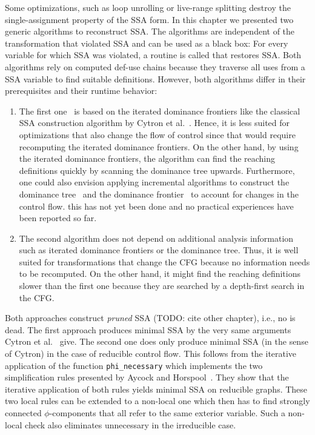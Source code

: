 Some optimizations, such as loop unrolling or live-range splitting destroy the single-assignment property of the SSA form.
In this chapter we presented two generic algorithms to reconstruct SSA.
The algorithms are independent of the transformation that violated SSA and can be used as a black box:
For every variable for which SSA was violated, a routine is called that restores SSA.
Both algorithms rely on computed def-use chains because they traverse all uses from a SSA variable to find suitable definitions.
However, both algorithms differ in their prerequisites and their runtime behavior:
\begin{enumerate}
	\item 
		The first one~\cite{Choi:1996ji} is based on the iterated dominance frontiers like the classical SSA construction algorithm by Cytron et al.~\cite{cytron:1991:ssa}.
		Hence, it is less suited for optimizations that also change the flow of control since that would require recomputing the iterated dominance frontiers.
		On the other hand, by using the iterated dominance frontiers, the algorithm can find the reaching definitions quickly by scanning the dominance tree upwards.
		Furthermore, one could also envision applying incremental algorithms to construct the dominance tree~\cite{Ramalingam:1994iq,Sreedhar:1995:ICD:202529.202531} and the dominance frontier~\cite{Sreedhar:1996:NFE:231379.231434} to account for changes in the control flow. 
		this has not yet been done and no practical experiences have been reported so far.
	\item 
		The second algorithm does not depend on additional analysis information such as iterated dominance frontiers or the dominance tree.
		Thus, it is well suited for transformations that change the CFG because no information needs to be recomputed.
		On the other hand, it might find the reaching definitions slower than the first one because they are searched by a depth-first search in the CFG.
\end{enumerate}
Both approaches construct \emph{pruned} SSA (TODO: cite other chapter), i.e., no \phifun is dead. 
The first approach produces minimal SSA by the very same arguments Cytron et al.~\cite{cytron:1991:ssa} give.
The second one does only produce minimal SSA (in the sense of Cytron) in the case of reducible control flow. 
This follows from the iterative application of the function \verb|phi_necessary| which implements the two simplification rules presented by Aycock and Horspool~\cite{Aycock_Horspool_2000}.
They show that the iterative application of both rules yields minimal SSA on reducible graphs. 
These two local rules can be extended to a non-local one which then has to find strongly connected $\phi$-components that all refer to the same exterior variable.
Such a non-local check also eliminates unnecessary \phifuns in the irreducible case.

